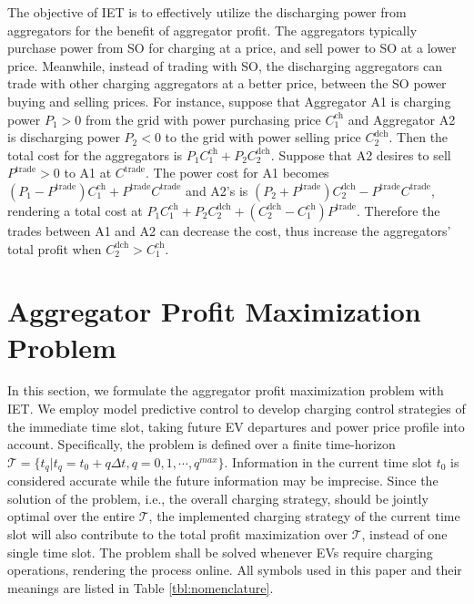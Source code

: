 \documentclass[conference]{IEEEtran}
\begin{document}
The objective of IET is to effectively utilize the discharging power from aggregators for the benefit of aggregator profit.
    The aggregators typically purchase power from SO for charging at a price, and sell power to SO at a lower price. Meanwhile, instead of trading with SO, the discharging aggregators can trade with other charging aggregators at a better price, between the SO power buying and selling prices. For instance, suppose that Aggregator A1 is charging power $P_1 >0$ from the grid with power purchasing price $C^\text{ch}_1$ and Aggregator A2 is discharging power $P_2 < 0$ to the grid with power selling price $C^\text{dch}_2$.
Then the total cost for the aggregators is $P_1C^\text{ch}_1+P_2C^\text{dch}_2$.
Suppose that A2 desires to sell $P^\text{trade} > 0$ to A1 at $C^\text{trade}$. 
The power cost for A1 becomes $(P_1 - P^\text{trade})C^\text{ch}_1 + P^\text{trade}C^\text{trade}$ and A2's is $(P_2 + P^\text{trade})C^\text{dch}_2 - P^\text{trade}C^\text{trade}$, rendering a total cost at $P_1C^\text{ch}_1+P_2C^\text{dch}_2 + (C^\text{dch}_2 - C^\text{ch}_1)P^\text{trade}$. 
Therefore the trades between A1 and A2 can decrease the cost, thus increase the aggregators' total profit when $C^\text{dch}_2>C^\text{ch}_1$.










	\section{Aggregator Profit Maximization Problem}\label{sec:centralized}
	


In this section, we formulate the aggregator profit maximization problem with IET.
We employ model predictive control to develop charging control strategies of the immediate time slot, taking future EV departures and power price profile into account. Specifically, the problem is defined over a finite time-horizon $\mathcal{T}=\{t_q|t_q=t_0+q\Delta t, q=0,1,\cdots,q^\textit{max}\}$. Information in the current time slot $t_0$ is considered accurate while the future information may be imprecise. Since the solution of the problem, i.e., the overall charging strategy, should be jointly optimal over the entire $\mathcal{T}$, the implemented charging strategy of the current time slot will also contribute to the total profit maximization over $\mathcal{T}$, instead of one single time slot. The problem shall be solved whenever EVs require charging operations, rendering the process online. All symbols used in this paper and their meanings are listed in Table \ref{tbl:nomenclature}.
    
\end{document}

